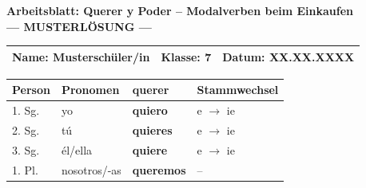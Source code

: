 \documentclass[11pt, a4paper]{article}
\newcommand{\fachfarbe}{spanisch}
\newcommand{\thema}{Querer y Poder -- Modalverben beim Einkaufen}
\newcommand{\klasse}{7}
\newcommand{\lsg}[1]{\textcolor{loesung}{\textbf{#1}}}
\begin{document}
\begin{center}
    {\Large\bfseries\textcolor{\fachfarbe}{Arbeitsblatt: \thema}}\\[0.3em]
    {\large\textcolor{loesung}{\textbf{--- MUSTERLÖSUNG ---}}}
\end{center}

\vspace{5pt}

\noindent
\begin{tabularx}{\textwidth}{|X|X|X|}
\hline
\textbf{Name:} \textcolor{loesung}{Musterschüler/in} &
\textbf{Klasse:} \klasse &
\textbf{Datum:} \textcolor{loesung}{XX.XX.XXXX} \\
\hline
\end{tabularx}

\vspace{15pt}


\begin{merkkasten}

\begin{center}
\begin{tabular}{|l|l|l|l|}
\hline
\textbf{Person} & \textbf{Pronomen} & \textbf{querer} & \textbf{Stammwechsel} \\
\hline
1. Sg. & yo & \lsg{quiero} & e $\rightarrow$ ie \\
\hline
2. Sg. & tú & \lsg{quieres} & e $\rightarrow$ ie \\
\hline
3. Sg. & él/ella & \lsg{quiere} & e $\rightarrow$ ie \\
\hline
1. Pl. & nosotros/-as & \lsg{queremos} & -- \\
\hline
\end{tabular}
\end{center}

\end{merkkasten}

\vspace{10pt}

\end{document}
